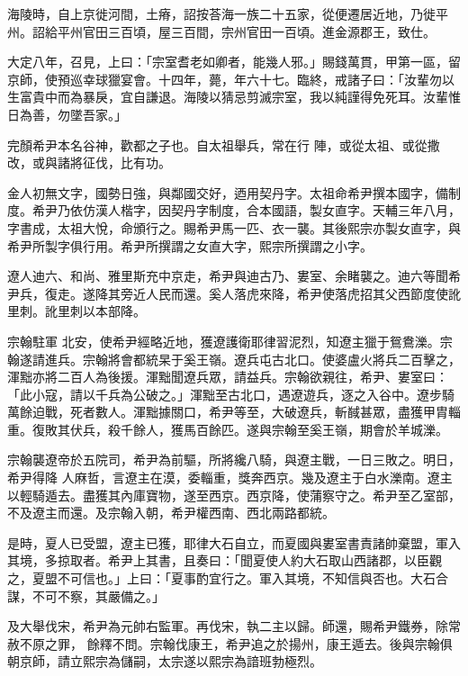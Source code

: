 \begin{pinyinscope}
 海陵時，自上京徙河間，土瘠，詔按荅海一族二十五家，從便遷居近地，乃徙平州。詔給平州官田三百頃，屋三百間，宗州官田一百頃。進金源郡王，致仕。



 大定八年，召見，上曰：「宗室耆老如卿者，能幾人邪。」賜錢萬貫，甲第一區，留京師，使預巡幸球獵宴會。十四年，薨，年六十七。臨終，戒諸子曰：「汝輩勿以生富貴中而為暴戾，宜自謙退。海陵以猜忌剪滅宗室，我以純謹得免死耳。汝輩惟日為善，勿墜吾家。」



 完顏希尹本名谷神，歡都之子也。自太祖舉兵，常在行
 陣，或從太祖、或從撒改，或與諸將征伐，比有功。



 金人初無文字，國勢日強，與鄰國交好，迺用契丹字。太祖命希尹撰本國字，備制度。希尹乃依仿漢人楷字，因契丹字制度，合本國語，製女直字。天輔三年八月，字書成，太祖大悅，命頒行之。賜希尹馬一匹、衣一襲。其後熙宗亦製女直字，與希尹所製字俱行用。希尹所撰謂之女直大字，熙宗所撰謂之小字。



 遼人迪六、和尚、雅里斯充中京走，希尹與迪古乃、婁室、余睹襲之。迪六等聞希尹兵，復走。遂降其旁近人民而還。奚人落虎來降，希尹使落虎招其父西節度使訛里刺。訛里刺以本部降。



 宗翰駐軍
 北安，使希尹經略近地，獲遼護衛耶律習泥烈，知遼主獵于鴛鴦濼。宗翰遂請進兵。宗翰將會都統杲于奚王嶺。遼兵屯古北口。使婆盧火將兵二百擊之，渾黜亦將二百人為後援。渾黜聞遼兵眾，請益兵。宗翰欲親往，希尹、婁室曰：「此小寇，請以千兵為公破之。」渾黜至古北口，遇遼遊兵，逐之入谷中。遼步騎萬餘迫戰，死者數人。渾黜據關口，希尹等至，大破遼兵，斬馘甚眾，盡獲甲胄輜重。復敗其伏兵，殺千餘人，獲馬百餘匹。遂與宗翰至奚王嶺，期會於羊城濼。



 宗翰襲遼帝於五院司，希尹為前驅，所將纔八騎，與遼主戰，一日三敗之。明日，希尹得降
 人麻哲，言遼主在漠，委輜重，獎奔西京。幾及遼主于白水濼南。遼主以輕騎遁去。盡獲其內庫寶物，遂至西京。西京降，使蒲察守之。希尹至乙室部，不及遼主而還。及宗翰入朝，希尹權西南、西北兩路都統。



 是時，夏人已受盟，遼主已獲，耶律大石自立，而夏國與婁室書責諸帥棄盟，軍入其境，多掠取者。希尹上其書，且奏曰：「聞夏使人約大石取山西諸郡，以臣觀之，夏盟不可信也。」上曰：「夏事酌宜行之。軍入其境，不知信與否也。大石合謀，不可不察，其嚴備之。」



 及大舉伐宋，希尹為元帥右監軍。再伐宋，執二主以歸。師還，賜希尹鐵券，除常赦不原之罪，
 餘釋不問。宗翰伐康王，希尹追之於揚州，康王遁去。後與宗翰俱朝京師，請立熙宗為儲嗣，太宗遂以熙宗為諳班勃極烈。




\end{pinyinscope}
